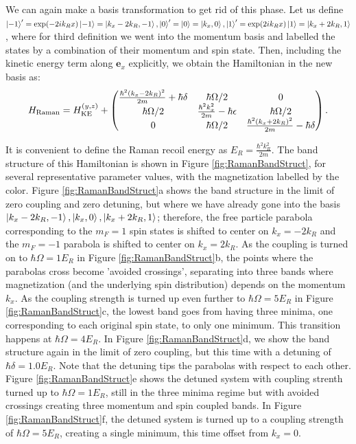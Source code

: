 	We can again make a basis transformation to get rid of this phase. Let us define  $\mathinner{|{-1}\rangle}' = {\rm exp}(-2ik_R x)\mathinner{|{-1}\rangle} = \mathinner{|{k_x-2k_R,-1}\rangle},\mathinner{|{0}\rangle}' = \mathinner{|{0}\rangle} = \mathinner{|{k_x,0}\rangle},\mathinner{|{1}\rangle}' = {\rm exp}(2ik_R x)\mathinner{|{1}\rangle}=\mathinner{|{k_x+2k_R,1}\rangle}$, where for third definition we went into the momentum basis and labelled the states by a combination of their momentum and spin state. Then, including the kinetic energy term along $\mathbf{e}_x$ explicitly, we obtain the Hamiltonian in the new basis as:
 \begin{equation}
H_{\rm Raman} = H_{\rm KE}^{(y,z)} +
 \begin{pmatrix} \frac{\hbar^2(k_x-2k_R)^2}{2m}+\hbar\delta & \hbar\Omega/2  &  0  \\ 
\hbar\Omega/2 & \frac{\hbar^2 k_x^2}{2m} - \hbar\epsilon &  \hbar\Omega/2\\
 0 & \hbar\Omega/2 &  \frac{\hbar^2(k_x+2k_R)^2}{2m} -\hbar\delta  \\
 \end{pmatrix} \\.
\label{eqn:RamanHam}
\end{equation}

It is convenient to define the Raman recoil energy as $E_R = \frac{\hbar^2 k_R^2}{2m}$. The band structure of this Hamiltonian is shown in Figure \ref{fig:RamanBandStruct}, for several representative parameter values, with the magnetization labelled by the color. Figure \ref{fig:RamanBandStruct}a shows the band structure in the limit of zero coupling and zero detuning, but where we have already gone into the basis $ \mathinner{|{k_x-2k_R,-1}\rangle}, \mathinner{|{k_x,0}\rangle},\mathinner{|{k_x+2k_R,1}\rangle}$; therefore, the free particle parabola corresponding to the $m_F=1$ spin states is shifted to center on $k_x=-2k_R$ and the $m_F=-1$ parabola is shifted to center on $k_x = 2k_R$. As the coupling is turned on to $\hbar\Omega = 1 E_R$ in Figure \ref{fig:RamanBandStruct}b, the points where the parabolas cross become 'avoided crossings', separating into three bands where magnetization (and the underlying spin distribution) depends on the momentum $k_x$. As the coupling strength is turned up even further to $\hbar\Omega = 5 E_R$ in Figure \ref{fig:RamanBandStruct}c, the lowest band goes from having three minima, one corresponding to each original spin state, to only one minimum. This transition happens at $\hbar\Omega = 4 E_R$\cite{KarinaThesis}. In Figure \ref{fig:RamanBandStruct}d, we show the band structure again in the limit of zero coupling, but this time with a detuning of $\hbar\delta = 1.0 E_R$. Note that the detuning tips the parabolas with respect to each other. Figure \ref{fig:RamanBandStruct}e shows the detuned system with coupling strenth turned up to $\hbar\Omega = 1 E_R$, still in the three minima regime but with avoided crossings creating three momentum and spin coupled bands. In Figure \ref{fig:RamanBandStruct}f, the detuned system is turned up to a coupling strength of $\hbar\Omega = 5E_R$, creating a single minimum, this time offset from $k_x = 0$.

